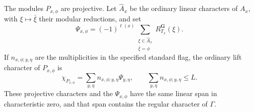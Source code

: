 \begin{proposition}\label{geom:projective-images}
The modules \(P_{x,\phi}\) are projective. Let
\(\widehat A_x\) be the ordinary linear characters of \(A_x\), with
\(\xi\mapsto\bar\xi\) their modular reductions, and set
\begin{equation}\label{geom:torus-sum}
 \Psi_{x,\phi}=(-1)^{\ell(x)}
       \sum_{\substack{\xi\in\widehat A_x\\\bar\xi=\phi}}
              R_{T_x}^{\mathbf G}(\xi).
\end{equation}
If \(n_{x,\phi;y,\eta}\) are the multiplicities in the specified
standard flag, the ordinary lift character of \(P_{x,\phi}\) is
\begin{equation}\label{geom:projective-character}
 \chi_{P_{x,\phi}}=
       \sum_{y,\eta} n_{x,\phi;y,\eta}\Psi_{y,\eta},
 \qquad \sum_{y,\eta}n_{x,\phi;y,\eta}\le L.
\end{equation}
These projective characters and the \(\Psi_{x,\phi}\) have the same
linear span in characteristic zero, and that span contains the
regular character of \(\Gamma\).
\end{proposition}

